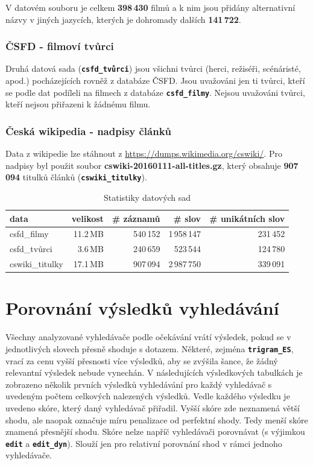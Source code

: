 \documentclass[11pt,letterpaper,oneside,openright]{book}
\newcommand{\bftt}[1]{\texttt{\textbf{#1}}}
\begin{document}
V datovém souboru je celkem \textbf{398\,430} filmů a k nim jsou přidány
alternativní názvy v jiných jazycích, kterých je dohromady dalších
\textbf{141\,722}.

\subsubsection{ČSFD - filmoví tvůrci}
Druhá datová sada (\bftt{csfd\_tvůrci}) jsou všichni tvůrci (herci, režiséři,
scénáristé, apod.) pocházejících rovněž z databáze ČSFD. Jsou uvažováni jen ti
tvůrci, kteří se podle dat podíleli na filmech z databáze \bftt{csfd\_filmy}.
Nejsou uvažováni tvůrci, kteří nejsou přiřazeni k žádnému filmu.

\subsubsection{Česká wikipedia - nadpisy článků}
Data z wikipedie lze stáhnout z \url{https://dumps.wikimedia.org/cswiki/}. Pro
nadpisy byl použit soubor \textbf{cswiki-20160111-all-titles.gz}, který
obsahuje \textbf{907\,094} titulků článků (\bftt{cswiki\_titulky}).


\mbox{}
\begin{tt}
\begin{table}[H]
\centering
\begin{tabulary}{\textwidth}{LRRRR}
\hline
\textbf{data} & \textbf{velikost} & \textbf{\# záznamů} & \textbf{\# slov} & \textbf{\# unikátních slov} \\
\hline
csfd\_filmy     & 11.2\,MB & 540\,152 & 1\,958\,147 & 231\,452 \\
csfd\_tvůrci    & 3.6\,MB  & 240\,659 & 523\,544    & 124\,780 \\
cswiki\_titulky & 17.1\,MB & 907\,094 & 2\,987\,750 & 339\,091 \\
\hline
\end{tabulary}
\caption{Statistiky datových sad}
\label{tab:data_stats}
\end{table}
\end{tt}

\section{Porovnání výsledků vyhledávání}
Všechny analyzované vyhledávače podle očekávání vrátí výsledek, pokud se v
jednotlivých slovech přesně shoduje s dotazem. Některé, zejména
\bftt{trigram\_ES}, vrací za cenu vyšší přesnosti více výsledků, aby se zvýšila
šance, že žádný relevantní výsledek nebude vynechán.  V následujících
výsledkových tabulkách je zobrazeno několik prvních výsledků vyhledávání pro
každý vyhledávač s uvedeným počtem celkových nalezených výsledků. Vedle každého
výsledku je uvedeno skóre, který daný vyhledávač přiřadil. Vyšší skóre zde
neznamená větší shodu, ale naopak označuje míru penalizace od perfektní shody.
Tedy menší skóre znamená přesnější shodu. Skóre nelze napříč vyhledávači
porovnávat (s výjimkou \bftt{edit} a \bftt{edit\_dyn}). Slouží jen pro
relativní porovnání shod v rámci jednoho vyhledávače.
\end{document}
